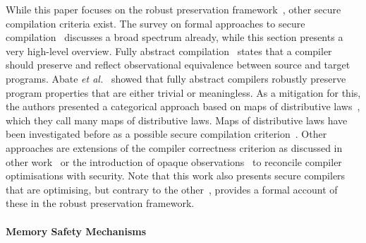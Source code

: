 \documentclass[dvipsnames,conference]{IEEEtran}
\theoremstyle{definition}
\begin{document}
While this paper focuses on the robust preservation framework~\cite{abate2019jour}, other secure compilation criteria exist.
The survey on formal approaches to secure compilation~\cite{patrignani2019survey} discusses a broad spectrum already, while this section presents a very high-level overview.
Fully abstract compilation~\cite{abadi1999fullabstraction} states that a compiler should preserve and reflect observational equivalence between source and target programs.
Abate \emph{et al.}~\cite{abate2021faandrc} showed that fully abstract compilers robustly preserve program properties that are either trivial or meaningless.
As a mitigation for this, the authors presented a categorical approach based on maps of distributive laws~\cite{watanabe2002modl}, which they call many maps of distributive laws.
Maps of distributive laws have been investigated before as a possible secure compilation criterion~\cite{tsampas2020catsc}.
Other approaches are extensions of the compiler correctness criterion as discussed in other work~\cite{patterson2019next700} or the introduction of opaque observations~\cite{vu2021reconciling} to reconcile compiler optimisations with security.
Note that this work also presents secure compilers that are optimising, but contrary to the other~\cite{vu2021reconciling}, provides a formal account of these in the robust preservation framework.

\paragraph*{Memory Safety Mechanisms}\label{subsec:relw:msmechs}
\end{document}
